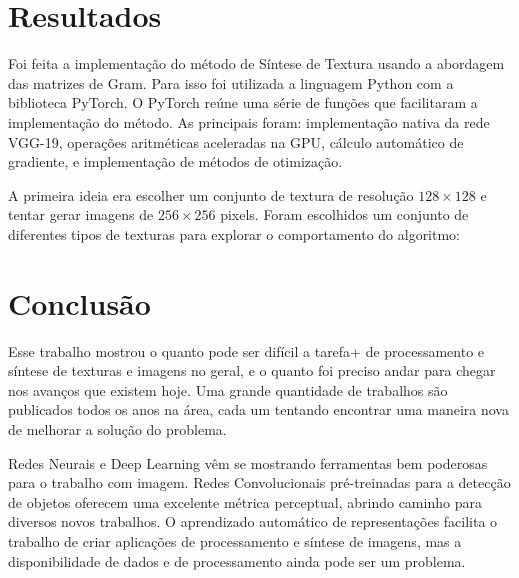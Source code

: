 \chapter{Resultados}


Foi feita a implementação do
método de Síntese de Textura
usando a abordagem das matrizes
de Gram. 
Para isso foi utilizada 
a linguagem Python com a
biblioteca PyTorch.
O PyTorch reúne uma série de
funções que facilitaram
a implementação do método.
As principais foram: implementação
nativa da rede VGG-19, operações
aritméticas aceleradas na GPU,
cálculo automático de gradiente,
e implementação de métodos de
otimização.


A primeira ideia era escolher um
conjunto de textura de resolução
$128 \times 128$ e tentar gerar
imagens de $256 \times 256$ pixels.
Foram escolhidos um conjunto de
diferentes tipos de texturas 
para explorar o comportamento
do algoritmo:








\chapter{Conclusão}

Esse trabalho mostrou o quanto
pode ser difícil a tarefa+ de
processamento e síntese
de texturas e imagens no geral,
e o quanto foi preciso andar
para chegar nos avanços que
existem hoje.
Uma grande quantidade de trabalhos
são publicados todos os anos
na área, cada um tentando
encontrar uma maneira nova de
melhorar a solução do problema.

Redes Neurais e Deep Learning
vêm se mostrando ferramentas
bem poderosas para o trabalho com imagem.
Redes Convolucionais pré-treinadas
para a detecção de objetos
oferecem uma excelente métrica
perceptual, abrindo caminho para
diversos novos trabalhos.
O aprendizado automático
de representações facilita
o trabalho de criar aplicações
de processamento e síntese de imagens,
mas a disponibilidade de dados
e de processamento ainda pode ser
um problema.


